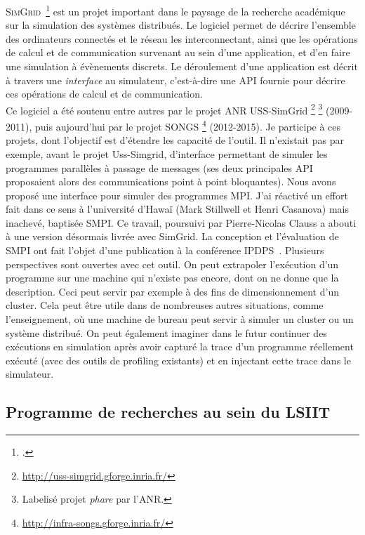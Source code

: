 \documentclass[11pt]{article}
\begin{document}
\textsc{SimGrid}~\footcite{Casanova08} est un projet important dans le paysage 
de la recherche académique sur la simulation des systèmes distribués. Le 
logiciel permet de décrire l'ensemble des ordinateurs connectés et le réseau 
les interconnectant, ainsi que les opérations de calcul et de communication 
survenant au sein d'une application, et d'en faire une simulation à évènements 
discrets. Le déroulement d'une application est décrit à travers une 
\emph{interface} au simulateur, c'est-à-dire une API fournie pour décrire ces 
opérations de calcul et de communication.\\

Ce logiciel a été soutenu entre autres par le projet ANR USS-SimGrid%
\footnote{\url{http://uss-simgrid.gforge.inria.fr/}} 
\footnote{Labelisé projet \textit{phare} par l'ANR.}
(2009-2011), puis aujourd'hui par le projet SONGS%
\footnote{\url{http://infra-songs.gforge.inria.fr/}} 
(2012-2015). Je participe à ces projets, dont l'objectif est d'étendre les 
capacité de l'outil. Il n'existait pas par exemple, avant le projet Uss-Simgrid,  
d'interface permettant de simuler les programmes parallèles à passage de 
messages (ses deux principales API proposaient alors des communications point à 
point bloquantes). Nous avons proposé une interface pour simuler des programmes 
MPI. J'ai réactivé un effort fait dans ce sens à l'université d'Hawaï (Mark 
Stillwell et Henri Casanova) mais inachevé, baptisée SMPI. Ce travail, poursuivi 
par Pierre-Nicolas Clauss a abouti à une version désormais livrée avec SimGrid. 
La conception et l'évaluation de SMPI ont fait l'objet d'une publication à la 
conférence IPDPS~\cite{icps-2011-224}. Plusieurs perspectives sont ouvertes avec 
cet outil. On peut extrapoler l'exécution d'un programme sur une machine qui 
n'existe pas encore, dont on ne donne que la description. Ceci peut servir par 
exemple à des fins de dimensionnement d'un cluster. Cela peut être utile dans 
de nombreuses autres situations, comme l'enseignement, où une machine de bureau 
peut servir à simuler un cluster ou un système distribué. On peut également 
imaginer dans le futur continuer des exécutions en simulation après avoir 
capturé la trace d'un programme réellement exécuté (avec des outils de 
profiling existants) et en injectant cette trace dans le simulateur.


\subsection{Programme de recherches au sein du LSIIT}
\end{document}
